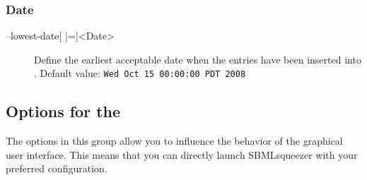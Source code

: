 \subsubsection{Date}
\begin{description}
\item[--lowest-date{[} |={]}<Date>]
  Define the earliest acceptable date when the entries have been
  inserted into \SABIO.
  Default value: \texttt{Wed Oct 15 00:00:00 PDT 2008}
\end{description}


\subsection{Options for the \GUI}

The options in this group allow you to influence the behavior of the graphical
user interface. This means that you can directly launch SBMLsqueezer with your
preferred configuration.
